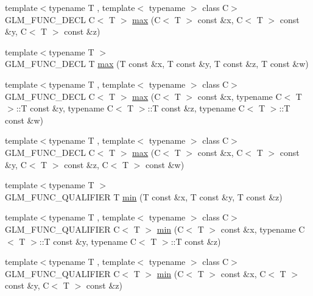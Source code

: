 \begin{DoxyCompactItemize}
\item 
{\footnotesize template$<$typename T , template$<$ typename $>$ class C$>$ }\\G\+L\+M\+\_\+\+F\+U\+N\+C\+\_\+\+D\+E\+CL C$<$ T $>$ \hyperlink{group__gtx__extented__min__max_gaf832e9d4ab4826b2dda2fda25935a3a4}{max} (C$<$ T $>$ const \&x, C$<$ T $>$ const \&y, C$<$ T $>$ const \&z)
\item 
{\footnotesize template$<$typename T $>$ }\\G\+L\+M\+\_\+\+F\+U\+N\+C\+\_\+\+D\+E\+CL T \hyperlink{group__gtx__extented__min__max_ga78e04a0cef1c4863fcae1a2130500d87}{max} (T const \&x, T const \&y, T const \&z, T const \&w)
\item 
{\footnotesize template$<$typename T , template$<$ typename $>$ class C$>$ }\\G\+L\+M\+\_\+\+F\+U\+N\+C\+\_\+\+D\+E\+CL C$<$ T $>$ \hyperlink{group__gtx__extented__min__max_ga7cca8b53cfda402040494cdf40fbdf4a}{max} (C$<$ T $>$ const \&x, typename C$<$ T $>$\+::T const \&y, typename C$<$ T $>$\+::T const \&z, typename C$<$ T $>$\+::T const \&w)
\item 
{\footnotesize template$<$typename T , template$<$ typename $>$ class C$>$ }\\G\+L\+M\+\_\+\+F\+U\+N\+C\+\_\+\+D\+E\+CL C$<$ T $>$ \hyperlink{group__gtx__extented__min__max_gaacffbc466c2d08c140b181e7fd8a4858}{max} (C$<$ T $>$ const \&x, C$<$ T $>$ const \&y, C$<$ T $>$ const \&z, C$<$ T $>$ const \&w)
\item 
{\footnotesize template$<$typename T $>$ }\\G\+L\+M\+\_\+\+F\+U\+N\+C\+\_\+\+Q\+U\+A\+L\+I\+F\+I\+ER T \hyperlink{group__gtx__extented__min__max_ga713d3f9b3e76312c0d314e0c8611a6a6}{min} (T const \&x, T const \&y, T const \&z)
\item 
{\footnotesize template$<$typename T , template$<$ typename $>$ class C$>$ }\\G\+L\+M\+\_\+\+F\+U\+N\+C\+\_\+\+Q\+U\+A\+L\+I\+F\+I\+ER C$<$ T $>$ \hyperlink{group__gtx__extented__min__max_ga74d1a96e7cdbac40f6d35142d3bcbbd4}{min} (C$<$ T $>$ const \&x, typename C$<$ T $>$\+::T const \&y, typename C$<$ T $>$\+::T const \&z)
\item 
{\footnotesize template$<$typename T , template$<$ typename $>$ class C$>$ }\\G\+L\+M\+\_\+\+F\+U\+N\+C\+\_\+\+Q\+U\+A\+L\+I\+F\+I\+ER C$<$ T $>$ \hyperlink{group__gtx__extented__min__max_ga42b5c3fc027fd3d9a50d2ccc9126d9f0}{min} (C$<$ T $>$ const \&x, C$<$ T $>$ const \&y, C$<$ T $>$ const \&z)

\end{DoxyCompactItemize}
